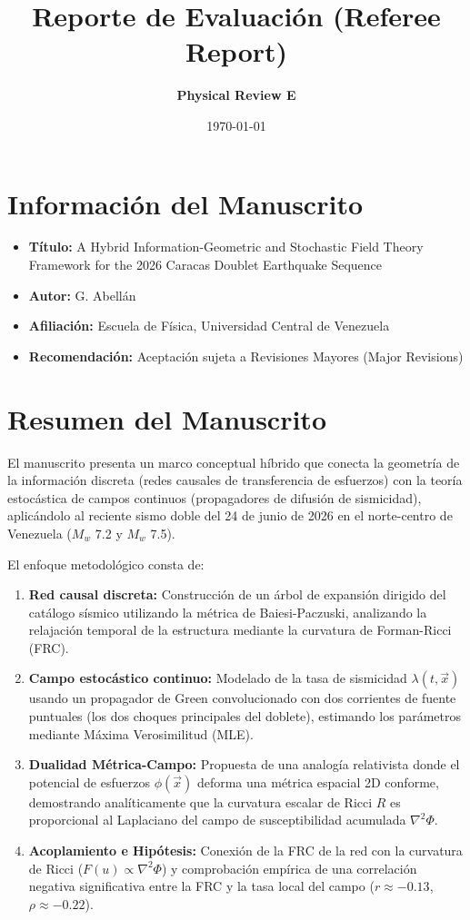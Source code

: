 \documentclass[11pt]{article}
\title{\textbf{Reporte de Evaluación (Referee Report)}}
\author{\textbf{Physical Review E}}
\date{\today}
\begin{document}
\maketitle

\section*{Información del Manuscrito}
\begin{itemize}
    \item \textbf{Título:} A Hybrid Information-Geometric and Stochastic Field Theory Framework for the 2026 Caracas Doublet Earthquake Sequence
    \item \textbf{Autor:} G. Abellán
    \item \textbf{Afiliación:} Escuela de Física, Universidad Central de Venezuela
    \item \textbf{Recomendación:} Aceptación sujeta a Revisiones Mayores (Major Revisions)
\end{itemize}

\section{Resumen del Manuscrito}
El manuscrito presenta un marco conceptual híbrido que conecta la geometría de la información discreta (redes causales de transferencia de esfuerzos) con la teoría estocástica de campos continuos (propagadores de difusión de sismicidad), aplicándolo al reciente sismo doble del 24 de junio de 2026 en el norte-centro de Venezuela ($M_w$ 7.2 y $M_w$ 7.5). 

El enfoque metodológico consta de:
\begin{enumerate}
    \item \textbf{Red causal discreta:} Construcción de un árbol de expansión dirigido del catálogo sísmico utilizando la métrica de Baiesi-Paczuski, analizando la relajación temporal de la estructura mediante la curvatura de Forman-Ricci (FRC).
    \item \textbf{Campo estocástico continuo:} Modelado de la tasa de sismicidad $\lambda(t, \vec{x})$ usando un propagador de Green convolucionado con dos corrientes de fuente puntuales (los dos choques principales del doblete), estimando los parámetros mediante Máxima Verosimilitud (MLE).
    \item \textbf{Dualidad Métrica-Campo:} Propuesta de una analogía relativista donde el potencial de esfuerzos $\phi(\vec{x})$ deforma una métrica espacial 2D conforme, demostrando analíticamente que la curvatura escalar de Ricci $R$ es proporcional al Laplaciano del campo de susceptibilidad acumulada $\nabla^2 \Phi$.
    \item \textbf{Acoplamiento e Hipótesis:} Conexión de la FRC de la red con la curvatura de Ricci ($F(u) \propto \nabla^2 \Phi$) y comprobación empírica de una correlación negativa significativa entre la FRC y la tasa local del campo ($r \approx -0.13$, $\rho \approx -0.22$).
\end{enumerate}
\end{document}
